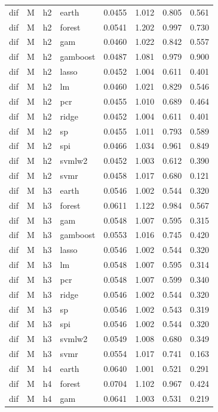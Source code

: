 \begin{ThreePartTable}
\begin{longtable}[t]{llclcccc}
dif & M & h2 & earth & 0.0455 & 1.012 & 0.805 & 0.561\\
dif & M & h2 & forest & 0.0541 & 1.202 & 0.997 & 0.730\\
dif & M & h2 & gam & 0.0460 & 1.022 & 0.842 & 0.557\\
dif & M & h2 & gamboost & 0.0487 & 1.081 & 0.979 & 0.900\\
dif & M & h2 & lasso & 0.0452 & 1.004 & 0.611 & 0.401\\
dif & M & h2 & lm & 0.0460 & 1.021 & 0.829 & 0.546\\
dif & M & h2 & pcr & 0.0455 & 1.010 & 0.689 & 0.464\\
dif & M & h2 & ridge & 0.0452 & 1.004 & 0.611 & 0.401\\
dif & M & h2 & sp & 0.0455 & 1.011 & 0.793 & 0.589\\
dif & M & h2 & spi & 0.0466 & 1.034 & 0.961 & 0.849\\
dif & M & h2 & svmlw2 & 0.0452 & 1.003 & 0.612 & 0.390\\
dif & M & h2 & svmr & 0.0458 & 1.017 & 0.680 & 0.121\\
\addlinespace
dif & M & h3 & earth & 0.0546 & 1.002 & 0.544 & 0.320\\
dif & M & h3 & forest & 0.0611 & 1.122 & 0.984 & 0.567\\
dif & M & h3 & gam & 0.0548 & 1.007 & 0.595 & 0.315\\
dif & M & h3 & gamboost & 0.0553 & 1.016 & 0.745 & 0.420\\
dif & M & h3 & lasso & 0.0546 & 1.002 & 0.544 & 0.320\\
dif & M & h3 & lm & 0.0548 & 1.007 & 0.595 & 0.314\\
dif & M & h3 & pcr & 0.0548 & 1.007 & 0.599 & 0.340\\
dif & M & h3 & ridge & 0.0546 & 1.002 & 0.544 & 0.320\\
dif & M & h3 & sp & 0.0546 & 1.002 & 0.543 & 0.319\\
dif & M & h3 & spi & 0.0546 & 1.002 & 0.544 & 0.320\\
dif & M & h3 & svmlw2 & 0.0549 & 1.008 & 0.680 & 0.349\\
dif & M & h3 & svmr & 0.0554 & 1.017 & 0.741 & 0.163\\
\addlinespace
dif & M & h4 & earth & 0.0640 & 1.001 & 0.521 & 0.291\\
dif & M & h4 & forest & 0.0704 & 1.102 & 0.967 & 0.424\\
dif & M & h4 & gam & 0.0641 & 1.003 & 0.531 & 0.219\\

\end{longtable}
\end{ThreePartTable}
